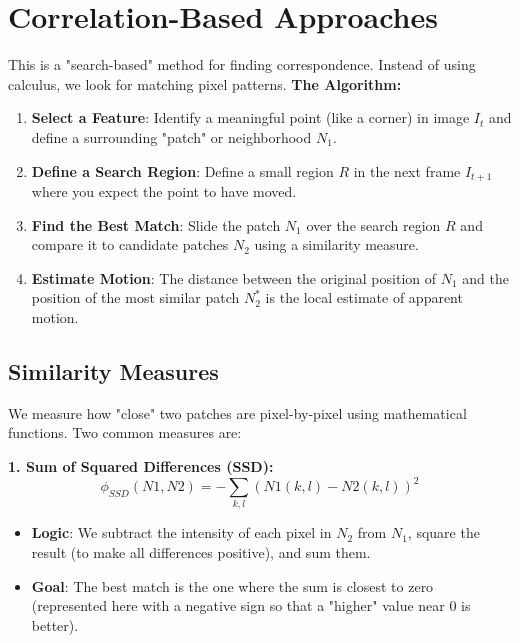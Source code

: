 \documentclass{report}
\begin{document}
\section{Correlation-Based Approaches}
This is a "search-based" method for finding correspondence. Instead of using calculus, we look for matching pixel patterns.
\textbf{The Algorithm:}
\begin{enumerate}
    \item \textbf{Select a Feature}: Identify a meaningful point (like a corner) in image $I_t$ and define a surrounding "patch"
          or neighborhood $N_1$.
    \item \textbf{Define a Search Region}: Define a small region $R$ in the next frame $I_{t+1}$ where you expect the point to have moved.
    \item \textbf{Find the Best Match}: Slide the patch $N_1$ over the search region $R$ and compare it to candidate patches $N_2$ using
          a similarity measure.
    \item \textbf{Estimate Motion}: The distance between the original position of $N_1$ and the position of the most similar patch $N_2^*$
          is the local estimate of apparent motion.
\end{enumerate}

\subsection{Similarity Measures}
We measure how "close" two patches are pixel-by-pixel using mathematical functions. Two common measures are:

\textbf{1. Sum of Squared Differences (SSD):}
\begin{equation}
    \phi_{SSD}(N1,N2)=-\sum_{k,l}(N1(k,l)-N2(k,l))^{2}
\end{equation}
\begin{itemize}
    \item \textbf{Logic}: We subtract the intensity of each pixel in $N_2$ from $N_1$, square the result (to make all differences positive),
          and sum them.
    \item \textbf{Goal}: The best match is the one where the sum is closest to zero (represented here with a negative sign so that a "higher"
          value near 0 is better).
\end{itemize}
\end{document}
